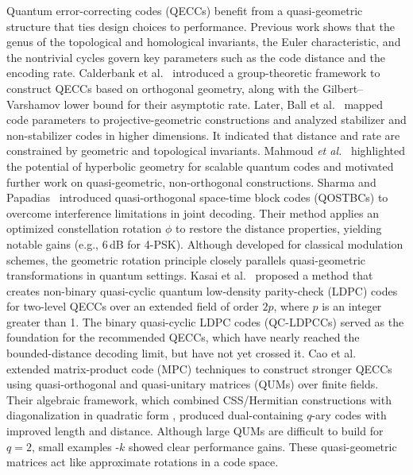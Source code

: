 \documentclass{iopjournal}
\theoremstyle{thmstyleone}%
\theoremstyle{thmstyletwo}%
\theoremstyle{thmstylethree}%
\begin{document}
Quantum error-correcting codes (QECCs) benefit from a quasi-geometric structure that ties design choices to performance. Previous work shows that the genus of the topological and homological invariants, the Euler characteristic, and the nontrivial cycles govern key parameters such as the code distance and the encoding rate. Calderbank et al.~\cite{Calderbank1997quantum} introduced a group-theoretic framework to construct QECCs based on orthogonal geometry, along with the Gilbert–Varshamov lower bound for their asymptotic rate.
Later, Ball et al.~\cite{Ball2023Quantum} mapped code parameters to projective-geometric constructions and analyzed stabilizer and non-stabilizer codes in higher dimensions. It indicated that distance and rate are constrained by geometric and topological invariants. Mahmoud \textit{et al.}~\cite{Mahmoud2025systematic} 
highlighted the potential of hyperbolic geometry for scalable quantum codes and motivated further work on quasi-geometric, non-orthogonal constructions.
Sharma and Papadias~\cite{Sharma2002improve} introduced quasi-orthogonal space-time block codes (QOSTBCs) to overcome interference limitations in joint decoding. Their method applies an optimized constellation rotation $\phi$ to restore the distance properties, yielding notable gains (e.g., $6$\,dB for 4-PSK). Although developed for classical modulation schemes, the geometric rotation principle closely parallels quasi-geometric transformations in quantum settings. 
 Kasai et al.~\cite{Kasai2011Non} proposed a method that creates non-binary quasi-cyclic quantum low-density parity-check (LDPC) codes for two-level QECCs over an extended field of order $2p$, where $p$ is an integer greater than 1. The binary quasi-cyclic LDPC codes (QC-LDPCCs) served as the foundation for the recommended QECCs, which have nearly reached the bounded-distance decoding limit, but have not yet crossed it. 
Cao et al.~\cite{Cao2020quantum} extended matrix-product code (MPC) techniques to construct stronger QECCs using quasi-orthogonal and quasi-unitary matrices (QUMs) over finite fields. Their algebraic framework, which combined CSS/Hermitian constructions with diagonalization in quadratic form , produced dual-containing $q$-ary codes with improved length and distance. Although large QUMs are difficult to build for $q=2$, small examples -$k$  showed clear performance gains. These quasi-geometric matrices act like approximate rotations in a code space.
\end{document}
